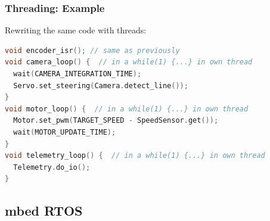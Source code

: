 \documentclass{beamer}
\begin{document}
\begin{frame}[fragile]
\frametitle{Threading: Example}
Rewriting the same code with threads:
\vspace{2px}
\begin{lstlisting}[language=C++,basicstyle=\ttfamily\scriptsize]
void encoder_isr(); // same as previously
void camera_loop() {  // in a while(1) {...} in own thread
  wait(CAMERA_INTEGRATION_TIME);
  Servo.set_steering(Camera.detect_line());      
}
void motor_loop() {  // in a while(1) {...} in own thread
  Motor.set_pwm(TARGET_SPEED - SpeedSensor.get());
  wait(MOTOR_UPDATE_TIME);  
}
void telemetry_loop() {  // in a while(1) {...} in own thread
  Telemetry.do_io();
}
\end{lstlisting}
\vspace{2px}
\end{frame}


\subsection{mbed RTOS}
\end{document}
